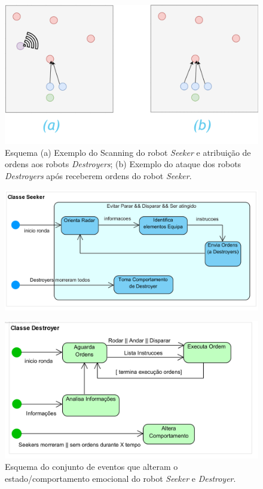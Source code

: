 \newpage
\begin{figure}[H]
    \centering
    \includegraphics[scale=0.4]{Imagens/Imagem2.png}
    \caption{Esquema (a) Exemplo do Scanning do robot \textit{Seeker} e atribuição de ordens aos robots \textit{Destroyers}; (b) Exemplo do ataque dos robots \textit{Destroyers} após receberem ordens do robot \textit{Seeker}.}
    \label{fig:tact1}
\end{figure}

\begin{figure}[H]
    \centering
    \includegraphics[scale=0.5]{Imagens/evt1.png}
    \label{fig:evet1}
    
    \centering
    \includegraphics[scale=0.5]{Imagens/evt2.png}
    \caption{Esquema do conjunto de eventos que alteram o estado/comportamento emocional do robot \textit{Seeker} e \textit{Destroyer}.}
    \label{fig:evet2}
\end{figure}
\newpage


